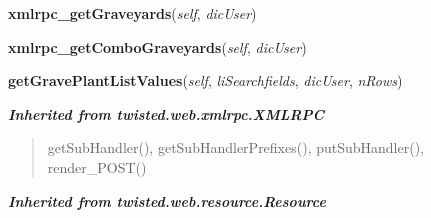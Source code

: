     \vspace{0.5ex}

\hspace{.8\funcindent}\begin{boxedminipage}{\funcwidth}

    \raggedright \textbf{xmlrpc\_getGraveyards}(\textit{self}, \textit{dicUser})

\setlength{\parskip}{2ex}
\setlength{\parskip}{1ex}
    \end{boxedminipage}

    \label{cuon:Grave:Grave:xmlrpc_getComboGraveyards}

    \vspace{0.5ex}

\hspace{.8\funcindent}\begin{boxedminipage}{\funcwidth}

    \raggedright \textbf{xmlrpc\_getComboGraveyards}(\textit{self}, \textit{dicUser})

\setlength{\parskip}{2ex}
\setlength{\parskip}{1ex}
    \end{boxedminipage}

    \label{cuon:Grave:Grave:getGravePlantListValues}

    \vspace{0.5ex}

\hspace{.8\funcindent}\begin{boxedminipage}{\funcwidth}

    \raggedright \textbf{getGravePlantListValues}(\textit{self}, \textit{liSearchfields}, \textit{dicUser}, \textit{nRows})

\setlength{\parskip}{2ex}
\setlength{\parskip}{1ex}
    \end{boxedminipage}


\large{\textbf{\textit{Inherited from twisted.web.xmlrpc.XMLRPC}}}

\begin{quote}
getSubHandler(), getSubHandlerPrefixes(), putSubHandler(), render\_POST()
\end{quote}

\large{\textbf{\textit{Inherited from twisted.web.resource.Resource}}}

